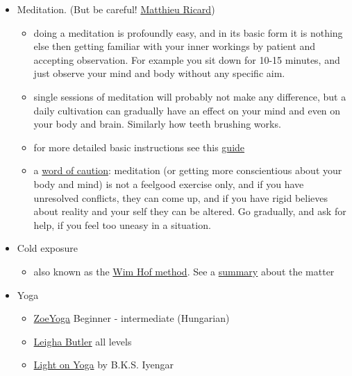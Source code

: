 \documentclass{article}
\begin{document}
\begin{itemize}
    \item Meditation. (But be careful! \href{https://www.youtube.com/watch?v=P8PCsy268As}{Matthieu Ricard})
    \begin{itemize}
    \item doing a meditation is profoundly easy, and in its basic form it is nothing else then getting familiar with your inner workings by patient and accepting observation. For example you sit down for 10-15 minutes, and just observe your mind and body without any specific aim.
    \item single sessions of meditation will probably not make any difference, but a daily cultivation can gradually have an effect on your mind and even on your body and brain. Similarly how teeth brushing works.
    \item for more detailed basic instructions see this \href{https://www.mindful.org/how-to-meditate/}{guide}
    \item a \href{https://www.sciencefocus.com/news/can-mindfulness-and-meditation-be-harmful/}{word of caution}: meditation (or getting more conscientious about your body and mind) is not a feelgood exercise only, and if you have unresolved conflicts, they can come up, and if you have rigid believes about reality and your self they can be altered. Go gradually, and ask for help, if you feel too uneasy in a situation.
    \end{itemize}
    \item Cold exposure
    \begin{itemize}
        \item also known as the \href{https://www.wimhofmethod.com/}{Wim Hof method}. See a \href{https://www.youtube.com/watch?v=D6EPuUdIC1E}{summary} about the matter
        \end{itemize}
    \item Yoga
    \begin{itemize}
        \item \href{https://www.facebook.com/kosazoe}{ZoeYoga} Beginner - intermediate (Hungarian)
        \item \href{https://www.youtube.com/channel/UCmHii9X_Ct0uWGOE-DibvbQ}{Leigha Butler} all levels
        \item \href{https://www.goodreads.com/book/show/56301.Light_on_Yoga}{Light on Yoga} by B.K.S. Iyengar
    \end{itemize}
\end{itemize}
\end{document}
